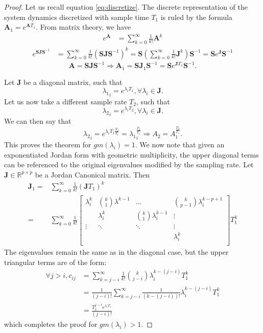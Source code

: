 \documentclass[twocolumn]{autart}    %
\newcommand{\mat}[1]{\boldsymbol{#1}}
\renewcommand{\vec}[1]{\boldsymbol{#1}}
\newtheorem{proof}{Proof}
\begin{document}
 \begin{proof}
 Let us recall equation \ref{eq:discretize}. The discrete representation of the system dynamics discretized with sample time $T_1$ is ruled by the formula
 $\mat{A}_1 = e^{\mat{A} T_1}$. From matrix theory, we have 
\begin{align}
 e^{\mat{A}}&=\sum_{k=0}^\infty \frac{1}{k!}\mat{A}^k
\end{align} 
\begin{align} 
 e^{\mat{S}\mat{J}\mat{S}^{-1}}&=\sum_{k=0}^\infty \frac{1}{k!}(\mat{S}\mat{J}\mat{S}^{-1})^k
 =\mat{S} \left (\sum_{k=0}^\infty \frac{1}{k!}\mat{J}^k\right) \mat{S}^{-1}
 =\mat{S}e^{\mat{J}}\mat{S}^{-1}
\end{align} 
\begin{equation}
\mat{A}=\mat{S}\mat{J}\mat{S}^{-1} \Rightarrow \vec{A}_1 = \mat{S}\mat{J}_1\mat{S}^{-1}= \mat{S}e^{\mat{J} T_1}\mat{S}^{-1}.
 \end{equation}
 
 Let $\mat{J}$ be a diagonal matrix, such that 
 $${\lambda_1}_i=e^{\lambda_i T_1}, \forall \lambda_i \in \mat{J}.$$
 Let us now take a different sample rate $T_2$, such that 
 $${\lambda_2}_i=e^{\lambda_i T_2}, \forall \lambda_i \in \mat{J}.$$
 We can then say that 
 \begin{equation}
 {\lambda_2}_i=e^{\lambda_i T_1 \frac{T_2}{T_1}}={\lambda_1}_i^{\frac{T_2}{T_1}} \Rightarrow A_2=A_1^{\frac{T_2}{T_1}}.
 \end{equation}
 This proves the theorem for $gm(\lambda_i)=1$.
 We now note that given an exponentiated Jordan form with geometric multiplicity, the upper diagonal terms can be
 referenced to the original eigenvalues modified by the sampling rate.
  Let $\mat{J}\in \mathbb{R}^{p \times p}$ be a Jordan Canonical matrix. Then
\begin{align}
 \mat{J}_1=&\sum_{k=0}^\infty \frac{1}{k!}\left(\mat{J}T_1\right)^k\nonumber\\
 =&\sum_{k=0}^\infty \frac{1}{k!} \left [ \begin{array}{cccc}
 \lambda_i^k  & \binom{k}{1}  \lambda^{k-1} & \hdots  & \binom{k}{p-1} \lambda_i^{k-p+1} \\
& \lambda_i^k  & \binom{k}{1}  \lambda_i^{k-1} & \vdots \\
\vdots & \ddots & \ddots & \vdots \\
& &  &\lambda_i^k \\
\end{array} \right ] T_1^k
\end{align}
%
The eigenvalues remain the same as in the diagonal case, but the upper triangular terms are of the form:
%
\begin{align}
\forall j>i, c_{ij}&=\sum_{k=j-i}^\infty \frac{1}{k!}\binom{k}{j-i} \lambda_i^{k-(j-i)}T_1^k\\
&=\frac{1}{(j-i)!}\sum_{k=j-i}^\infty \frac{1}{(k-(j-i))!} \lambda_i^{k-(j-i)}T_1^k\nonumber\\
&=\frac{T_1^{j-i}e^{\lambda_i T_1}}{(j-i)!}\nonumber
\end{align}
which completes the proof for $gm(\lambda_i)>1$.
\end{proof}
\end{document}
